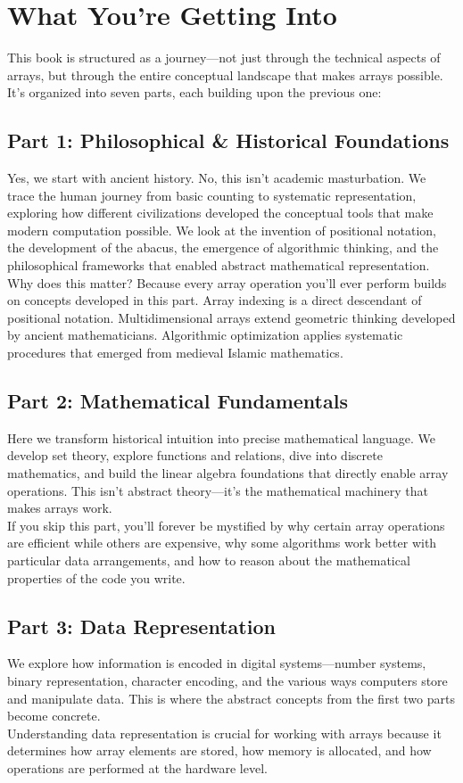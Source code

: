 \section*{What You're Getting Into}

This book is structured as a journey—not just through the technical aspects of arrays, but through the entire conceptual landscape that makes arrays possible. It's organized into seven parts, each building upon the previous one:

\subsection*{Part 1: Philosophical \& Historical Foundations}
Yes, we start with ancient history. No, this isn't academic masturbation. We trace the human journey from basic counting to systematic representation, exploring how different civilizations developed the conceptual tools that make modern computation possible. We look at the invention of positional notation, the development of the abacus, the emergence of algorithmic thinking, and the philosophical frameworks that enabled abstract mathematical representation.\\
Why does this matter? Because every array operation you'll ever perform builds on concepts developed in this part. Array indexing is a direct descendant of positional notation. Multidimensional arrays extend geometric thinking developed by ancient mathematicians. Algorithmic optimization applies systematic procedures that emerged from medieval Islamic mathematics.

\subsection*{Part 2: Mathematical Fundamentals}
Here we transform historical intuition into precise mathematical language. We develop set theory, explore functions and relations, dive into discrete mathematics, and build the linear algebra foundations that directly enable array operations. This isn't abstract theory—it's the mathematical machinery that makes arrays work.\\
If you skip this part, you'll forever be mystified by why certain array operations are efficient while others are expensive, why some algorithms work better with particular data arrangements, and how to reason about the mathematical properties of the code you write.

\subsection*{Part 3: Data Representation}
We explore how information is encoded in digital systems—number systems, binary representation, character encoding, and the various ways computers store and manipulate data. This is where the abstract concepts from the first two parts become concrete.\\
Understanding data representation is crucial for working with arrays because it determines how array elements are stored, how memory is allocated, and how operations are performed at the hardware level.

